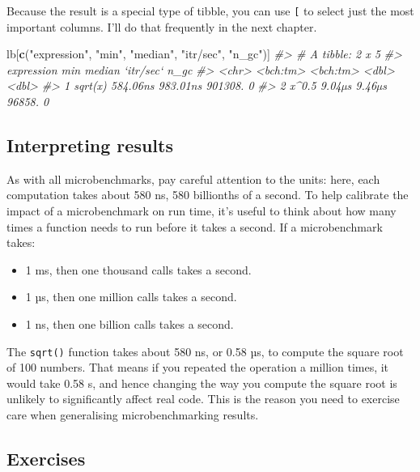 \documentclass[]{book}
\newenvironment{Shaded}{\begin{snugshade}}{\end{snugshade}}
\newcommand{\CommentTok}[1]{\textcolor[rgb]{0.37,0.37,0.37}{\textit{#1}}}
\newcommand{\KeywordTok}[1]{\textcolor[rgb]{0.27,0.27,0.27}{\textbf{#1}}}
\newcommand{\NormalTok}[1]{#1}
\newcommand{\StringTok}[1]{\textcolor[rgb]{0.5,0.5,0.5}{#1}}
\providecommand{\tightlist}{%
  \setlength{\itemsep}{0pt}\setlength{\parskip}{0pt}}
\begin{document}
Because the result is a special type of tibble, you can use \texttt{{[}} to select just the most important columns. I'll do that frequently in the next chapter.

\begin{Shaded}
\begin{Highlighting}[]
\NormalTok{lb[}\KeywordTok{c}\NormalTok{(}\StringTok{"expression"}\NormalTok{, }\StringTok{"min"}\NormalTok{, }\StringTok{"median"}\NormalTok{, }\StringTok{"itr/sec"}\NormalTok{, }\StringTok{"n_gc"}\NormalTok{)]}
\CommentTok{#> # A tibble: 2 x 5}
\CommentTok{#>   expression      min   median `itr/sec`  n_gc}
\CommentTok{#>   <chr>      <bch:tm> <bch:tm>     <dbl> <dbl>}
\CommentTok{#> 1 sqrt(x)    584.06ns 983.01ns   901308.     0}
\CommentTok{#> 2 x^0.5        9.04µs   9.46µs    96858.     0}
\end{Highlighting}
\end{Shaded}

\hypertarget{interpreting-results}{%
\subsection{Interpreting results}\label{interpreting-results}}

As with all microbenchmarks, pay careful attention to the units: here, each computation takes about 580 ns, 580 billionths of a second. To help calibrate the impact of a microbenchmark on run time, it's useful to think about how many times a function needs to run before it takes a second. If a microbenchmark takes:

\begin{itemize}
\tightlist
\item
  1 ms, then one thousand calls takes a second.
\item
  1 µs, then one million calls takes a second.
\item
  1 ns, then one billion calls takes a second.
\end{itemize}

The \texttt{sqrt()} function takes about 580 ns, or 0.58 µs, to compute the square root of 100 numbers. That means if you repeated the operation a million times, it would take 0.58 s, and hence changing the way you compute the square root is unlikely to significantly affect real code. This is the reason you need to exercise care when generalising microbenchmarking results.

\hypertarget{exercises-17}{%
\subsection{Exercises}\label{exercises-17}}
\end{document}
